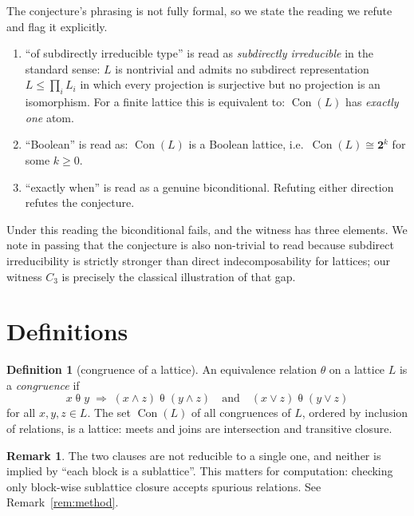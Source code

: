 \documentclass[11pt]{article}
\theoremstyle{definition}
\newtheorem{definition}[theorem]{Definition}
\newtheorem{remark}[theorem]{Remark}
\newcommand{\Con}{\operatorname{Con}}
\begin{document}
The conjecture's phrasing is not fully formal, so we state the reading we
refute and flag it explicitly.

\begin{enumerate}
\item ``of subdirectly irreducible type'' is read as \emph{subdirectly
      irreducible} in the standard sense: $L$ is nontrivial and admits no
      subdirect representation $L \le \prod_i L_i$ in which every projection
      is surjective but no projection is an isomorphism. For a finite lattice
      this is equivalent to: $\Con(L)$ has \emph{exactly one} atom.
\item ``Boolean'' is read as: $\Con(L)$ is a Boolean lattice, i.e.\
      $\Con(L) \cong \mathbf{2}^k$ for some $k \ge 0$.
\item ``exactly when'' is read as a genuine biconditional. Refuting either
      direction refutes the conjecture.
\end{enumerate}

Under this reading the biconditional fails, and the witness has three
elements. We note in passing that the conjecture is also non-trivial to read
because subdirect irreducibility is strictly stronger than direct
indecomposability for lattices; our witness $C_3$ is precisely the classical
illustration of that gap.

\section{Definitions}

\begin{definition}[congruence of a lattice]\label{def:congruence}
An equivalence relation $\theta$ on a lattice $L$ is a \emph{congruence} if
\[
x \mathrel{\theta} y \;\Longrightarrow\;
(x \wedge z) \mathrel{\theta} (y \wedge z)
\quad\text{and}\quad
(x \vee z) \mathrel{\theta} (y \vee z)
\]
for all $x, y, z \in L$. The set $\Con(L)$ of all congruences of $L$, ordered
by inclusion of relations, is a lattice: meets and joins are intersection and
transitive closure.
\end{definition}

\begin{remark}
The two clauses are not reducible to a single one, and neither is implied by
``each block is a sublattice''. This matters for computation: checking only
block-wise sublattice closure accepts spurious relations. See
Remark~\ref{rem:method}.
\end{remark}
\end{document}
